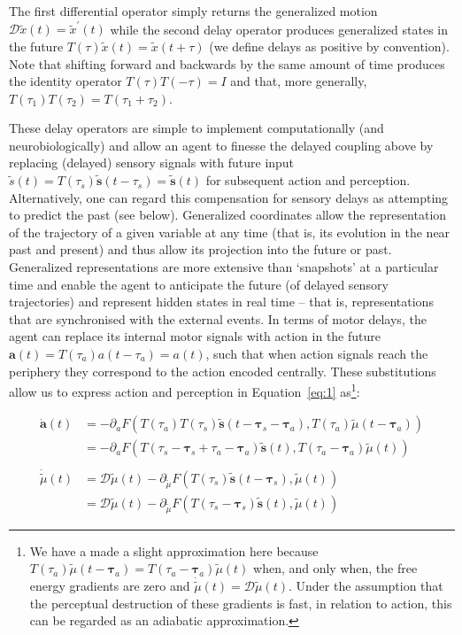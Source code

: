 \documentclass[a4paper]{article} %
\begin{document}
The first differential operator simply returns the generalized motion $\mathcal{D}  \tilde{x}(t) = \tilde{x}^{\prime}(t)$ while the second delay operator produces generalized states in the
future $T(\tau)   \tilde{x}(t) = \tilde{x}(t+\tau)$ (we define delays as positive by convention). Note that shifting forward and backwards by the same amount of time produces the identity operator $T(\tau)  T(-\tau) = I$ and that, more generally, $T(\tau_1)  T(\tau_2) = T(\tau_1 + \tau_2)$.

These delay operators are simple to implement computationally (and
neurobiologically) and allow an agent to finesse the delayed coupling
above by replacing (delayed) sensory signals with future input
$\tilde{s}(t)=T(\tau_s)\bm{\tilde{s}}(t-\tau_s) = \bm{\tilde{s}}(t)$ for subsequent action and perception. Alternatively, one
can regard this compensation for sensory delays as attempting to predict
the past (see below). Generalized coordinates allow the representation
of the trajectory of a given variable at any time (that is, its
evolution in the near past and present) and thus allow its projection
into the future or past. Generalized representations are more extensive
than `snapshots' at a particular time and enable the agent to anticipate
the future (of delayed sensory trajectories) and represent hidden states
in real time -- that is, representations that are synchronised with the
external events. In terms of motor delays, the agent can replace its
internal motor signals with action in the future
$\bm{a}(t) = T(\tau_a) a(t-\tau_a) = a(t) $,
such that when action signals reach the periphery they correspond to the
action encoded centrally. These substitutions allow us to express action
and perception in Equation~\ref{eq:1}
as\footnote{We have a made a slight approximation here because $T(\tau_a) \tilde{\mu}(t-\bm{\tau}_a) = T(\tau_a-\bm{\tau}_a) \tilde{\mu}(t)$ when, and only when, the free energy gradients are zero and $\dot{\tilde{\mu}}(t) = \mathcal{D} \tilde{\mu}(t)$. Under the assumption that the perceptual destruction of these gradients is fast, in relation to action, this can
be regarded as an adiabatic approximation.}:

\begin{align}
\bm{\dot{a}}(t) &= -\partial_a F(T(\tau_a) T(\tau_s)  \bm{\tilde{s}}(t-\bm{\tau}_s-\bm{\tau}_a), T(\tau_a) \tilde{\mu}(t-\bm{\tau}_a))\nonumber  \\%
                &= -\partial_a F(T(\tau_s-\bm{\tau}_s+\tau_a-\bm{\tau}_a)  \bm{\tilde{s}}(t), T(\tau_a-\bm{\tau}_a) \tilde{\mu}(t))\nonumber  \\%
\label{eq:6} \\%
\dot{\tilde{\mu}}(t) &= \mathcal{D}\tilde{\mu}(t)-\partial_{\tilde{\mu}} F(T(\tau_s) \bm{\tilde{s}}(t-\bm{\tau}_s), \tilde{\mu}(t))\nonumber  \\%
                &= \mathcal{D}\tilde{\mu}(t)-\partial_{\tilde{\mu}} F(T(\tau_s-\bm{\tau}_s) \bm{\tilde{s}}(t), \tilde{\mu}(t))\nonumber  %
\end{align}%
\end{document}
